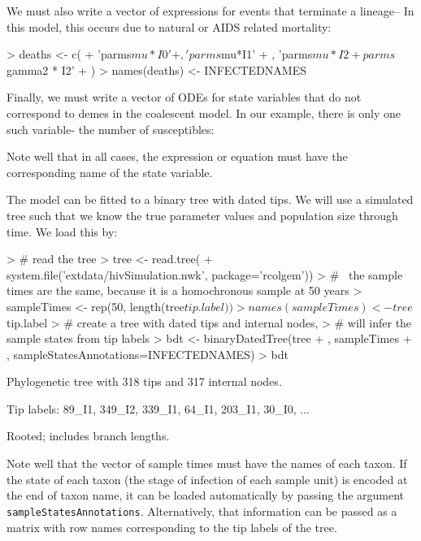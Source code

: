 \documentclass{article}
\begin{document}
We must also write a vector of expressions for events that terminate a lineage-- In this model, this occurs due to natural or AIDS related mortality: 
\begin{Schunk}
\begin{Sinput}
> deaths <- c(
+  'parms$mu*I0'
+  , 'parms$mu*I1'
+  , 'parms$mu*I2 + parms$gamma2 * I2'
+ )
> names(deaths) <- INFECTEDNAMES
\end{Sinput}
\end{Schunk}

Finally, we must write a vector of ODEs for state variables that do not correspond to demes in the coalescent model. 
In our example, there is only one such variable- the number of susceptibles: 
\begin{Schunk}
\end{Schunk}
Note well that in all cases, the expression or equation must have the corresponding name of the state variable. 

The model can be fitted to a binary tree with dated tips. 
We will use a simulated tree such that we know the true parameter values and population size through time. 
We load this by: 
\begin{Schunk}
\begin{Sinput}
> # read the tree
> tree <- read.tree(
+    system.file('extdata/hivSimulation.nwk', package='rcolgem'))
> #~ the sample times are the same, because it is a homochronous sample at 50 years
> sampleTimes <- rep(50, length(tree$tip.label))
> names(sampleTimes) <- tree$tip.label
> # create a tree with dated tips and internal nodes, 
> # will infer the sample states from tip labels
> bdt <- binaryDatedTree(tree
+   , sampleTimes
+   , sampleStatesAnnotations=INFECTEDNAMES)
> bdt
\end{Sinput}
\begin{Soutput}
Phylogenetic tree with 318 tips and 317 internal nodes.

Tip labels:
	89_I1, 349_I2, 339_I1, 64_I1, 203_I1, 30_I0, ...

Rooted; includes branch lengths.
\end{Soutput}
\end{Schunk}
Note well that the vector of sample times must have the names of each taxon. 
If the state of each taxon (the stage of infection of each sample unit) is encoded at the end of taxon name, it can be loaded automatically by passing the argument \texttt{sampleStatesAnnotations}.  
Alternatively, that information can be passed as a matrix with row names corresponding to the tip labels of the tree. 
\end{document}
